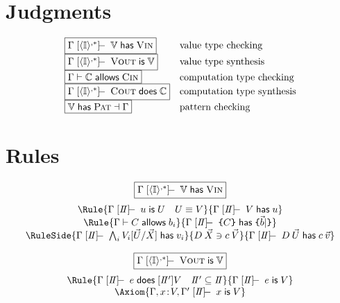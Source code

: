 \documentclass{article}
\begin{document}
\section{Judgments}

\newcommand{\jfont}{\mathsf}
\newcommand{\has}{\;\jfont{has}\;}
\newcommand{\is}{\;\jfont{is}\;}
\newcommand{\allows}{\;\jfont{allows}\;}
\newcommand{\does}{\;\jfont{does}\;}
\newcommand{\fbx}[1]{\framebox{\(#1\)}}
\newcommand{\tns}[1]{\;[#1]\hspace*{-0.06in}-\;}

\[\begin{array}{ll}
\fbx{\Gamma \tns{\gb{\IT}{,*}} \VT \has \vin} & \mbox {value type checking}\\
\fbx{\Gamma \tns{\gb{\IT}{,*}} \vout \is \VT} & \mbox{value type synthesis} \\
\fbx{\Gamma \vdash \CT \allows \cin} & \mbox{computation type checking}\\
\fbx{\Gamma \tns{\gb{\IT}{,*}} \cout \does \CT} & \mbox{computation type synthesis}\\
\fbx{\VT \has \pat \dashv \Gamma} & \mbox{pattern checking}\\
\end{array}\]

\section{Rules}

\newcommand{\Is}{I\hspace*{-0.03in}I}

\[\begin{array}{c}
\fbx{\Gamma \tns{\gb{\IT}{,*}} \VT \has \vin}
\medskip\\
\Rule{\Gamma \tns{\Is} u \is U \quad U \equiv V}
     {\Gamma \tns{\Is} V \has u}
\\
\Rule{\Gamma \vdash C \allows b_i}
     {\Gamma \tns{\Is} \sus{C} \has \sus{\vec{b}|}}
\\
\RuleSide
  {\Gamma \tns{\Is} \bigwedge_i V_i[\vec{U}/\vec{X}] \has v_i}
  {D\:\vec{X} \ni c\:\vec{V}}
  {\Gamma \tns{\Is} D\:\vec{U} \has c\:\vec{v}}
\end{array}\]

\[\begin{array}{c}
\fbx{\Gamma \tns{\gb{\IT}{,*}} \vout \is \VT}
\medskip\\
\Rule{\Gamma \tns{\Is} e \does [\Is']V\quad \Is'\subseteq \Is }
     {\Gamma \tns{\Is} e \is V}
\\
\Axiom{\Gamma,x\isc V,\Gamma' \tns{\Is} x \is V}
\end{array}\]
\end{document}
